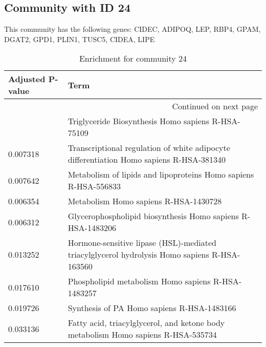 \subsection*{Community with ID 24}
This community has the following genes: CIDEC, ADIPOQ, LEP, RBP4, GPAM, DGAT2, GPD1, PLIN1, TUSC5, CIDEA, LIPE
\\
\begin{longtable}{p{2.4cm}p{14.5cm}}
\caption{Enrichment for community 24}\\
\toprule
Adjusted \newline P-value &                                                                                          Term \\
\midrule
\endhead
\midrule
\multicolumn{2}{r}{{Continued on next page}} \\
\midrule
\endfoot

\bottomrule
\endlastfoot
                 0.008502 &                                            Triglyceride Biosynthesis Homo sapiens R-HSA-75109 \\
                 0.007318 &       Transcriptional regulation of white adipocyte differentiation Homo sapiens R-HSA-381340 \\
                 0.007642 &                               Metabolism of lipids and lipoproteins Homo sapiens R-HSA-556833 \\
                 0.006354 &                                                         Metabolism Homo sapiens R-HSA-1430728 \\
                 0.006312 &                                   Glycerophospholipid biosynthesis Homo sapiens R-HSA-1483206 \\
                 0.013252 &  Hormone-sensitive lipase (HSL)-mediated triacylglycerol hydrolysis Homo sapiens R-HSA-163560 \\
                 0.017610 &                                            Phospholipid metabolism Homo sapiens R-HSA-1483257 \\
                 0.019726 &                                                    Synthesis of PA Homo sapiens R-HSA-1483166 \\
                 0.033136 &             Fatty acid, triacylglycerol, and ketone body metabolism Homo sapiens R-HSA-535734 \\
\end{longtable}


